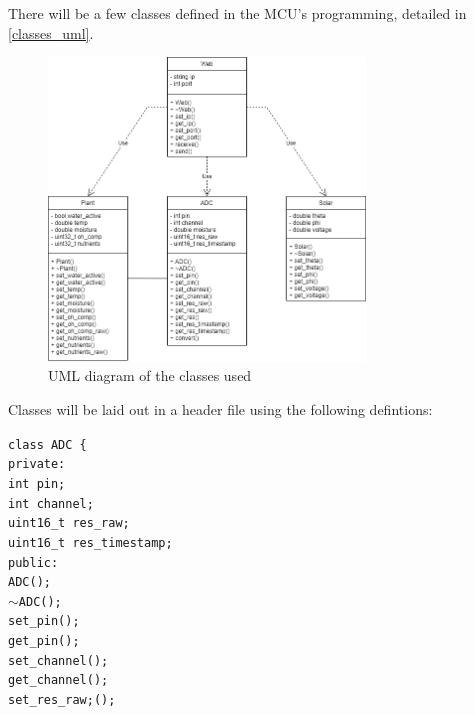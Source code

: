 \begin{flushleft}
    There will be a few classes defined in the MCU's programming, detailed
    in \autoref{classes_uml}.
    \begin{figure}[H]
        \caption{UML diagram of the classes used}
        \label{classes_uml}
        \centering
        \includegraphics[width=0.75\textwidth]{images/classes_uml.png}
    \end{figure}
    Classes will be laid out in a header file using the following defintions:
    \begin{flushleft}
        \texttt{class ADC \{}  \\
        \quad\texttt{private:} \\
        \quad\quad\texttt{int pin;} \\
        \quad\quad\texttt{int channel;} \\
        \quad\quad\texttt{uint16\_t res\_raw;} \\
        \quad\quad\texttt{uint16\_t res\_timestamp;} \\
        \quad\texttt{public:} \\
        \quad\quad\texttt{ADC();} \\
        \quad\quad\texttt{$\sim$ADC();} \\
        \quad\quad\texttt{set\_pin();} \\
        \quad\quad\texttt{get\_pin();} \\
        \quad\quad\texttt{set\_channel();} \\
        \quad\quad\texttt{get\_channel();} \\
        \quad\quad\texttt{set\_res\_raw;();} \\

\end{flushleft}
\end{flushleft}
